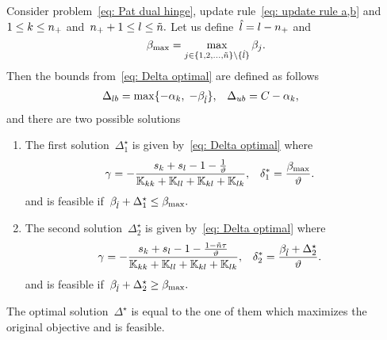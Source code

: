 \begin{lemma}
  Consider problem~\eqref{eq: Pat dual hinge}, update rule~\eqref{eq: update rule a,b} and~$1 \leq k \leq n_{+}$ and~$n_{+} + 1 \leq l \leq \tilde{n}.$ Let us define~$\hat{l} = l - n_{+}$ and
  \begin{equation*}
    \beta_{\max} = \max_{j \in \{1, 2, \ldots, \tilde{n} \} \setminus \{\hat{l}\}} \beta_j.
  \end{equation*}
  Then the bounds from~\eqref{eq: Delta optimal} are defined as follows
  \begin{align*}
    \Delta_{lb} & = \max\{- \alpha_k,\; -\beta_{\hat{l}} \}, &
    \Delta_{ub} & = C - \alpha_k,
  \end{align*}
  and there are two possible solutions
  \begin{enumerate}
    \item The first solution~$\Delta^{\star}_1$ is given by~\eqref{eq: Delta optimal} where
    \begin{align*}
      \gamma
        & = -\frac{s_k + s_l - 1 - \frac{1}{\vartheta}}{\mathbb{K}_{kk} + \mathbb{K}_{ll} + \mathbb{K}_{kl} + \mathbb{K}_{lk}}, &
      \delta^{*}_1
        & = \frac{\beta_{\max}}{\vartheta}.
    \end{align*}
    and is feasible if~$\beta_{\hat{l}} + \Delta^{\star}_1 \leq \beta_{\max}.$
    \item The second solution~$\Delta^{\star}_2$ is given by~\eqref{eq: Delta optimal} where
    \begin{align*}
      \gamma
        & = -\frac{s_k + s_l - 1 - \frac{1 - \tilde{n} \tau}{\vartheta}}{\mathbb{K}_{kk} + \mathbb{K}_{ll} + \mathbb{K}_{kl} + \mathbb{K}_{lk}}, &
      \delta^{*}_2
        & = \frac{\beta_{\hat{l}} + \Delta^{\star}_2}{\vartheta}.
    \end{align*}
    and is feasible if~$\beta_{\hat{l}} + \Delta^{\star}_2 \geq \beta_{\max}.$
  \end{enumerate}
  The optimal solution~$\Delta^{\star}$ is equal to the one of them which maximizes the original objective and is feasible.
\end{lemma}

